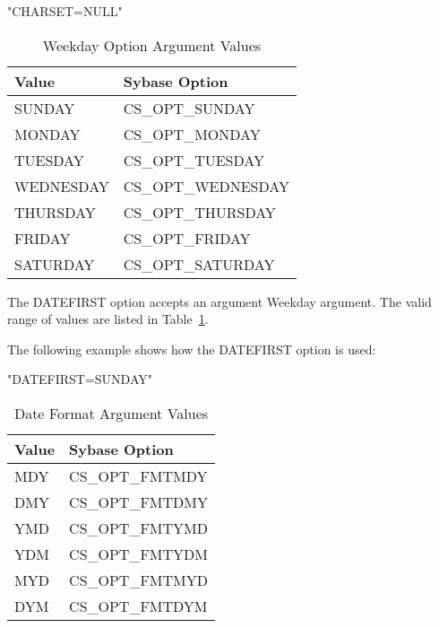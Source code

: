 \documentclass[english,letterpaper]{book}
\begin{document}
\begin{Example}

   "CHARSET=NULL"

\end{Example}

\begin{table}
   \begin{center}
      \begin{tabular}{ll}
         Value             &  Sybase Option\\
         \hline 
         SUNDAY            &  CS\_OPT\_SUNDAY\\
         MONDAY            &  CS\_OPT\_MONDAY\\
         TUESDAY           &  CS\_OPT\_TUESDAY\\
         WEDNESDAY         &  CS\_OPT\_WEDNESDAY\\
         THURSDAY          &  CS\_OPT\_THURSDAY\\
         FRIDAY            &  CS\_OPT\_FRIDAY\\
         SATURDAY          &  CS\_OPT\_SATURDAY\\
      \end{tabular}
   \end{center}
   \caption{Weekday Option Argument Values}\label{t:wkday}
\end{table}

The DATEFIRST option accepts an argument Weekday argument. The valid
range of values are listed in Table~\ref{t:wkday}.

The following example shows how the DATEFIRST option is used:

\begin{Example}

   "DATEFIRST=SUNDAY"

\end{Example}

\begin{table}
   \begin{center}
      \begin{tabular}{ll}
      Value    &  Sybase Option\\
      \hline 
      MDY      &  CS\_OPT\_FMTMDY\\
      DMY      &  CS\_OPT\_FMTDMY\\
      YMD      &  CS\_OPT\_FMTYMD\\
      YDM      &  CS\_OPT\_FMTYDM\\
      MYD      &  CS\_OPT\_FMTMYD\\
      DYM      &  CS\_OPT\_FMTDYM\\
      \end{tabular}
   \end{center}
   \caption{Date Format Argument Values}\label{t:dtfmt}
\end{table}
\end{document}
